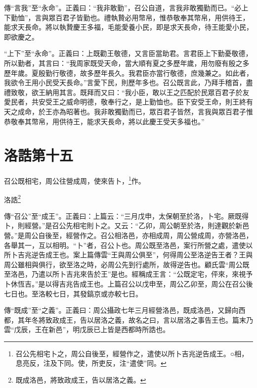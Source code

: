 {\noindent\zhuan{}\fzbyks 傳“言我”至“永命”。正義曰：“我非敢勤”，召公自道，言我非敢獨勤而已。“必上下勤恤”，言與眾百君子皆勤也。禮執贄必用幣帛，惟恭敬奉其幣帛，用供待王，能求天長命。將以執贄慶王多福，毛能愛養小民，即是求天長命，待王能愛小民，即欲慶之。 \par}

{\noindent\shu{}\fzkt “上下”至“永命”。正義曰：上既勸王敬德，又言臣當助君。言君臣上下勤憂敬德，所以勤者，其言曰：“我周家既受天命，當大順有夏之多歷年歲，用勿廢有殷之多歷年歲。夏殷勤行敬德，故多歷年長久。我君臣亦當行敬德，庶幾兼之。如此者，我欲令王用小民受天長命。”言愛下民，則歷年多也。召公既言此，乃拜手稽首，盡禮致敬，欲王納用其言。既拜而又曰：“我小臣，敢以王之匹配於民眾百君子於友愛民者，共安受王之威命明德，敬奉行之，是上勤恤也。臣下安受王命，則王終有天之成命，於王亦為昭著也。我非敢獨勤而已，眾百君子皆然，言我與眾百君子惟恭敬奉其幣帛，用供待王，能求天長命，將以此慶王受天多福也。” \par}

\section{洛誥第十五}


召公既相宅，周公往營成周，使來告卜，\footnote{召公先相宅卜之，周公自後至，經營作之，遣使以所卜吉兆逆告成王。○相，息亮反，注及下同。使，所吏反，注“遣使”同。}作。

洛誥\footnote{既成洛邑，將致政成王，告以居洛之義。}


{\noindent\zhuan{}\fzbyks 傳“召公”至“成王”。正義曰：上篇云：“三月戊申，太保朝至於洛，卜宅。厥既得卜，則經營。”是召公先相宅則卜之。又云：“乙卯，周公朝至於洛，則達觀於新邑營。”是周公自後至，經營作之。召公相洛邑，亦相成周，周公營成周，亦營洛邑，各舉其一，互以相明。“卜”者，召公卜也。周公既至洛邑，案行所營之處，遣使以所卜吉兆逆告成王也。案上篇傳雲“王與周公俱至”，何得周公至洛逆告王者？王與周公雖相與俱行，欲至洛之時，必周公先到行處所，故得逆告也。顧氏雲“周公既至洛邑，乃遣以所卜吉兆來告於王”是也。經稱成王言：“公既定宅，伻來，來視予卜休恆吉。”是以得吉兆告成王也。上篇召公以戊申至，周公乙卯至，周公在召公後七日也。至洛較七日，其發鎬京或亦較七日。 \par}

{\noindent\zhuan{}\fzbyks 傳“既成”至“之義”。正義曰：周公攝政七年三月經營洛邑，既成洛邑，又歸向西都，其年冬將致政成王，告以居洛之義，故名之曰，言以居洛之事告王也。篇末乃雲“戊辰，王在新邑”，明戊辰已上皆是西都時所誥也。 \par}


